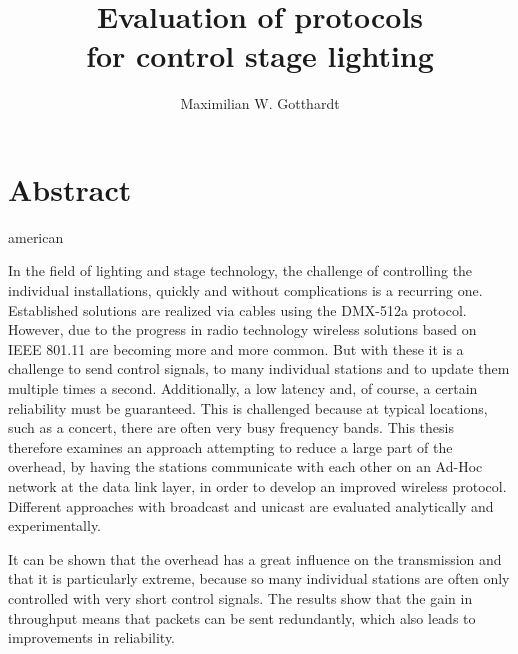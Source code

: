 \documentclass[]{ccs-thesis}
\author{Maximilian W. Gotthardt}
\title{Evaluation of protocols \\for control stage lighting}
\begin{document}

\maketitle

\thispagestyle{empty}

\cleardoublepage

\chapter*{Abstract}
\begin{otherlanguage*}{american}


In the field of lighting and stage technology, the challenge of controlling the individual installations, 
quickly and without complications is a recurring one.
Established solutions are realized via cables using the DMX-512a protocol. 
However, due to the progress in radio technology 
wireless solutions based on IEEE 801.11 are becoming more and more common. 
But with these it is a challenge to send control signals, 
to many individual stations and to update them multiple times a second.
Additionally, a low latency and, of course, a certain reliability must be guaranteed.
This is challenged because at typical locations, such as a concert, there are often very busy frequency bands.
This thesis therefore examines an approach attempting to reduce a large part of the overhead,
by having the stations communicate with each other on an Ad-Hoc network at the data link layer,
in order to develop an improved wireless protocol.
Different approaches with broadcast and unicast are evaluated analytically and experimentally.

It can be shown that the overhead has a great influence on the transmission and that it is particularly extreme,
because so many individual stations are often only controlled with very short control signals.
The results show that the gain in throughput means that packets can be sent redundantly,
which also leads to improvements in reliability.

\end{otherlanguage*}
\end{document}
